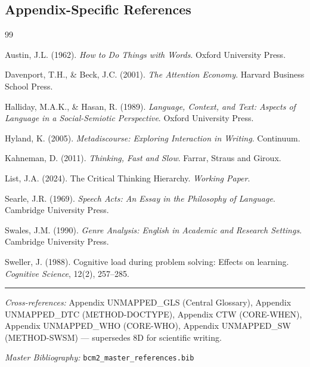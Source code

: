 \subsection{Appendix-Specific References}

\begin{thebibliography}{99}

 Austin, J.L. (1962).
\textit{How to Do Things with Words}.
Oxford University Press.

 Davenport, T.H., \& Beck, J.C. (2001).
\textit{The Attention Economy}.
Harvard Business School Press.

 Halliday, M.A.K., \& Hasan, R. (1989).
\textit{Language, Context, and Text: Aspects of Language in a Social-Semiotic Perspective}.
Oxford University Press.

 Hyland, K. (2005).
\textit{Metadiscourse: Exploring Interaction in Writing}.
Continuum.

 Kahneman, D. (2011).
\textit{Thinking, Fast and Slow}.
Farrar, Straus and Giroux.

 List, J.A. (2024).
The Critical Thinking Hierarchy.
\textit{Working Paper}.

 Searle, J.R. (1969).
\textit{Speech Acts: An Essay in the Philosophy of Language}.
Cambridge University Press.

 Swales, J.M. (1990).
\textit{Genre Analysis: English in Academic and Research Settings}.
Cambridge University Press.

 Sweller, J. (1988).
Cognitive load during problem solving: Effects on learning.
\textit{Cognitive Science}, 12(2), 257--285.

\end{thebibliography}



\vspace{1em}
\hrule
\vspace{0.5em}

\noindent\textit{Cross-references:}
Appendix UNMAPPED_GLS (Central Glossary),
Appendix UNMAPPED_DTC (METHOD-DOCTYPE),
Appendix CTW (CORE-WHEN),
Appendix UNMAPPED_WHO (CORE-WHO),
Appendix UNMAPPED_SW (METHOD-SWSM) --- supersedes 8D for scientific writing.

\noindent\textit{Master Bibliography:} \texttt{bcm2\_master\_references.bib}



